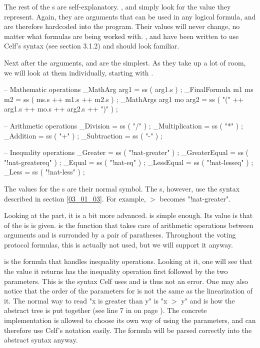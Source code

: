 The rest of the s are self-explanatory. ,  and  simply look for the value they represent. Again, they are arguments that can be used in any logical formula, and are therefore hardcoded into the program. Their values will never change, no matter what formulas are being worked with. , and  have been written to use Celf's syntax (see section 3.1.2) and should look familiar.

Next after the arguments,  and  are the simplest. As they take up a lot of room, we will look at them individually, starting with .

\begin{lstgf}
        -- Mathematic operations
        _MathArg arg1                   = ss ( arg1.s ) ;
        _FinalFormula m1 ms m2          = ss ( ms.s ++ m1.s ++ m2.s ) ;
        _MathArgs arg1 mo arg2          = ss ( "(" ++ arg1.s ++ mo.s ++ arg2.s ++ ")" ) ;

        -- Arithmetic operations
        _Division                       = ss ( "/" ) ;
        _Multiplication                 = ss ( "*" ) ;
        _Addition                       = ss ( "+" ) ;
        _Subtraction                    = ss ( "-" ) ;

        -- Inequality operations
        _Greater                        = ss ( "!nat-greater" ) ;
        _GreaterEqual                   = ss ( "!nat-greatereq" ) ;
        _Equal                          = ss ( "!nat-eq" ) ;
        _LessEqual                      = ss ( "!nat-lesseq" ) ;
        _Less                           = ss ( "!nat-less" ) ;
\end{lstgf}
The values for the s are their normal symbol. The s, however, use the syntax described in section \ref{03_01_03}. For example, $>$ becomes "!nat-greater".

Looking at the  part, it is a bit more advanced.  is simple enough. Its value is that of the  is is given.  is the function that takes care of arithmetic operations between arguments and is surronded by a pair of paratheses. Throughout the voting protocol formulas, this is actually not used, but we will support it anyway.

 is the formula that handles inequality operations. Looking at it, one will see that the value it returns has the inequality operation first followed by the two parameters. This is the syntax Celf uses and is thus not an error. One may also notice that the order of the parameters for  is not the same as the linearization of it. The normal way to read "x is greater than y" is "x $>$ y" and is how the abstract tree is put together (see line 7 in  on page \pageref{code:04_01_C04}). The concrete implementation is allowed to choose its own way of using the parameters, and can therefore use Celf's notation easily. The formula will be parsed correctly into the abstract syntax anyway.

